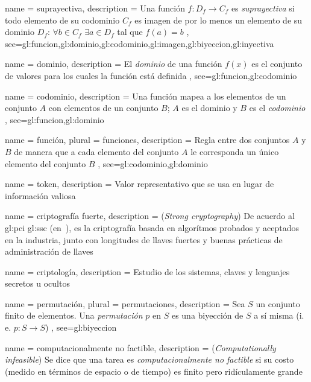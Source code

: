 {
  name = suprayectiva,
  description = {
    Una función $f:D_f \rightarrow C_f$ es \textit{suprayectiva} si
    todo elemento de su codominio $C_f$ es imagen de
    por lo menos un elemento de su dominio $D_f$: $\forall b \in C_f$
    $\exists a \in D_f$ tal que $f(a)=b$%
  },
  see={gl:funcion,gl:dominio,gl:codominio,gl:imagen,gl:biyeccion,gl:inyectiva}
}

{
  name = dominio,
  description = {
    El \textit{dominio} de una función $f(x)$ es el conjunto de
    valores para los cuales la función está definida%
  },
  see={gl:funcion,gl:codominio}
}

{
  name = codominio,
  description = {
    Una función mapea a los elementos de un conjunto $A$ con elementos
    de un conjunto $B$; $A$ es el dominio y $B$ es el
    \textit{codominio}%
  },
  see={gl:funcion,gl:dominio}
}

{
  name = función,
  plural = funciones,
  description = {
    Regla entre dos conjuntos $A$ y $B$ de manera que a cada elemento del
    conjunto $A$ le corresponda un único elemento del conjunto $B$%
  },
  see={gl:codominio,gl:dominio}
}

{
  name = token,
  description = {
    Valor representativo que se usa en lugar de información valiosa%
  }
}

{
  name = criptografía fuerte,
  description = {
    (\textit{Strong cryptography}) De acuerdo al \gls{gl:pci} \gls{gl:ssc}
    (en~\cite{dss_glosario}), es la criptografía basada en algorítmos probados
    y aceptados en la industria, junto con longitudes de llaves fuertes y
    buenas prácticas de administración de llaves%
  }
}

{
  name = criptología,
  description = {
    Estudio de los sistemas, claves y lenguajes secretos u ocultos%
  }
}

{
  name = permutación,
  plural = permutaciones,
  description = {
    Sea $ S $ un conjunto finito de elementos. Una \textit{permutación} $ p $
    en $ S $ es una biyección de $ S $ a sí misma (i. e.
    $ p: S \rightarrow S $)%
  },
  see={gl:biyeccion}
}

{
  name = computacionalmente no factible,
  description = {
    (\textit{Computationally infeasible}) Se dice que una tarea es
    \textit{computacionalmente no factible} si su costo (medido en términos de
    espacio o de tiempo) es finito pero ridículamente grande%
  }
}

